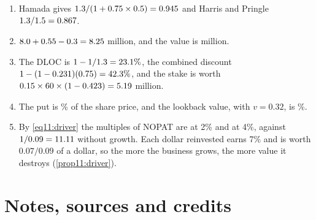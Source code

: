 \begin{chapterrefs}
\begin{enumerate}[label=\textbf{11.\arabic*}, leftmargin=*]
  little safer than under continuous rebalancing, worth a little more, and the cost of capital is lower.
  \item Hamada gives $1.3/(1+0.75\times0.5)=0.945$ and Harris and Pringle $1.3/1.5=0.867$.
  \item $8.0+0.55-0.3=8.25$ million, and the value is \ykV{} million.
  \item The DLOC is $1-1/1.3=23.1\%$, the combined discount $1-(1-0.231)(0.75)=42.3\%$, and the stake
  is worth $0.15\times60\times(1-0.423)=5.19$ million.
  \item The put is \ymPut\% of the share price, and the lookback value, with $v=0.32$, is \ymLs\%.
  \item By \cref{eq11:driver} the multiples of NOPAT are \ynLow{} at 2\% and \ynHigh{} at 4\%, against
  $1/0.09=11.11$ without growth. Each dollar reinvested earns 7\% and is worth $0.07/0.09$ of a dollar,
  so the more the business grows, the more value it destroys (\cref{prop11:driver}).
\end{enumerate}

\FloatBarrier
\section{Notes, sources and credits}
\label{sec11:credits}


\end{chapterrefs}
